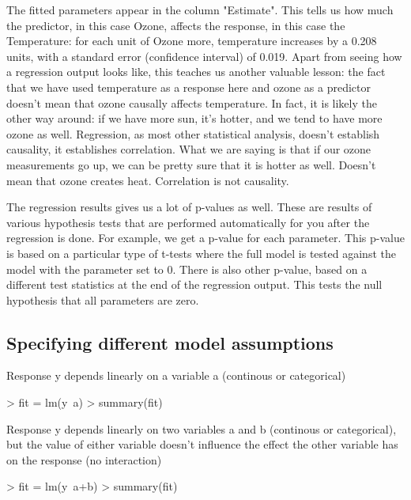 \documentclass[a4paper,twoside]{tufte-book} %
\begin{document}
The fitted parameters appear in the column "Estimate". This tells us how much the predictor, in this case Ozone, affects the response, in this case the Temperature: for each unit of Ozone more, temperature increases by a 0.208 units, with a standard error (confidence interval) of 0.019. Apart from seeing how a regression output looks like, this teaches us another valuable lesson: the fact that we have used temperature as a response here and ozone as a predictor doesn't mean that ozone causally affects temperature.  In fact, it is likely the other way around: if we have more sun, it's hotter, and we tend to have more ozone as well. Regression, as most other statistical analysis, doesn't establish causality, it establishes correlation. What we are saying is that if our ozone measurements go up, we can be pretty sure that it is hotter as well. Doesn't mean that ozone creates heat. Correlation is not causality. 

The regression results gives us a lot of p-values as well. These are results of various hypothesis tests that are performed automatically for you after the regression is done. For example, we get a p-value for each parameter. This p-value is based on a particular type of t-tests where the full model is tested against the model with the parameter set to 0. There is also other p-value, based on a different test statistics at the end of the regression output. This tests the null hypothesis that all parameters are zero.  

\subsection{Specifying different model assumptions}

Response y depends linearly on a variable a (continous or categorical)

\begin{Schunk}
\begin{Sinput}
> fit = lm(y~a)
> summary(fit)
\end{Sinput}
\end{Schunk}

Response y depends linearly on two variables a and b (continous or categorical), but the value of either variable doesn't influence the effect the other variable has on the response (no interaction)

\begin{Schunk}
\begin{Sinput}
> fit = lm(y~a+b)
> summary(fit)
\end{Sinput}
\end{Schunk}
\end{document}
